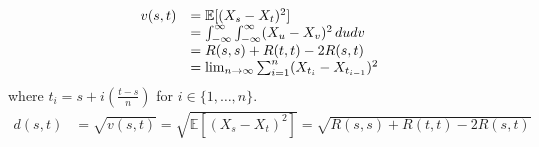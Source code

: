 \documentclass{article}
\begin{document}
\begin{equation}
  \begin{array}{ll}
    v (s, t) & =\mathbb{E} [(X_s - X_t)^2]\\
    & = \int_{- \infty}^{\infty} \int_{- \infty}^{\infty} (X_u - X_v)^2 
    \hspace{0.17em} dudv\\
    & = R (s, s) + R (t, t) - 2 R (s, t)\\
    & = \lim_{n \to \infty}  \sum_{i = 1}^n (X_{t_i} - X_{t_{i - 1}})^2
  \end{array}
\end{equation}
where $t_i = s + i (\frac{t - s}{n})$ for $i \in \{1, \ldots, n\}$.
\begin{equation}
  \begin{array}{ll}
    d (s, t) & = \sqrt{v (s, t)} = \sqrt{\mathbb{E} [(X_s - X_t)^2]} = \sqrt{R
    (s, s) + R (t, t) - 2 R (s, t)}
  \end{array}
\end{equation}
\end{document}
